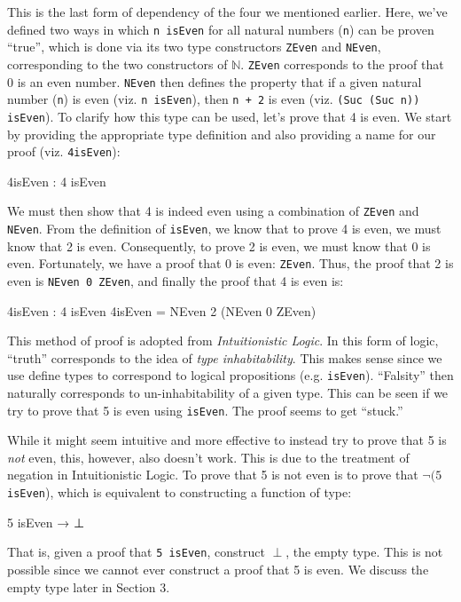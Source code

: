 \documentclass[12pt]{article}
\begin{document}
This is the last form of dependency of the four we mentioned earlier. Here,
we've defined two ways in which {\tt n isEven} for all natural numbers
({\tt n}) can be proven ``true'', which is done via its two type constructors
{\tt ZEven} and {\tt NEven}, corresponding to the two constructors of
\(\mathbb{N}\). {\tt ZEven} corresponds to the proof that 0 is an even number.
{\tt NEven} then defines the property that if a given natural number ({\tt n}) is
even (viz. {\tt n isEven}), then {\tt n + 2} is even (viz. {\tt (Suc (Suc n))
isEven}). To clarify how this type can be used, let's prove that 4 is even. We
start by providing the appropriate type definition and also providing a name for
our proof (viz. {\tt 4isEven}):
\begin{center}
\begin{minipage}{0.5\textwidth}
\begin{code}
4isEven : 4 isEven
\end{code}
\end{minipage}
\end{center}
We must then show that 4 is indeed even using a combination of {\tt ZEven} and
{\tt NEven}. From the definition of {\tt isEven}, we know that to prove 4 is
even, we must know that 2 is even.  Consequently, to prove 2 is even, we must
know that 0 is even. Fortunately, we have a proof that 0 is even: {\tt ZEven}.
Thus, the proof that 2 is even is {\tt NEven 0 ZEven}, and finally the proof
that 4 is even is:
\begin{center}
\begin{minipage}{0.5\textwidth}
\begin{code}
4isEven : 4 isEven
4isEven = NEven 2 (NEven 0 ZEven)
\end{code}
\end{minipage}
\end{center}

This method of proof is adopted from {\em Intuitionistic Logic}. In this form of
logic, ``truth'' corresponds to the idea of {\em type inhabitability}. This
makes sense since we use define types to correspond to logical propositions
(e.g. {\tt isEven}). ``Falsity'' then naturally corresponds to un-inhabitability
of a given type. This can be seen if we try to prove that 5 is even using
{\tt isEven}. The proof seems to get ``stuck.''

While it might seem intuitive and more effective to instead try to prove that 5
is {\em not} even, this, however, also doesn't work. This is due to the
treatment of negation in Intuitionistic Logic. To prove that 5 is not even is
to prove that \(\neg (5\) {\tt isEven}), which is equivalent to constructing a
function of type:
\begin{center}
\begin{minipage}{0.2\textwidth}
\begin{code}
5 isEven → ⊥
\end{code}
\end{minipage}
\end{center}
That is, given a proof that {\tt 5 isEven}, construct \(\perp\), the empty type.
This is not possible since we cannot ever construct a proof that 5 is even. We
discuss the empty type later in Section 3.
\end{document}
